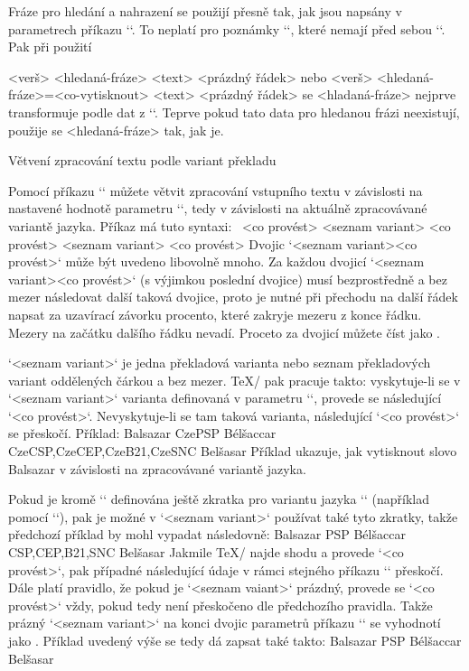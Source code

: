Fráze pro hledání a nahrazení se použijí přesně tak, jak jsou napsány v
parametrech příkazu `\ww`. To neplatí pro poznámky `\Note`, které nemají
před sebou `\ww`. Pak při použití

\begtt
\Note <verš> {<hledaná-fráze>} <text> <prázdný řádek>
\endtt
nebo
\begtt
\Note <verš> {<hledaná-fráze>}={<co-vytisknout>} <text> <prázdný řádek>
\endtt
se <hladaná-fráze> nejprve transformuje podle dat z `\vdef`. Teprve pokud
tato data pro hledanou frázi neexistují, použije se <hledaná-fráze> tak,
jak je.


\secc Větvení zpracování textu podle variant překladu

\mnote{\code{\\switch}}
Pomocí příkazu `\switch` můžete větvit zpracování vstupního textu v
závislosti na nastavené hodnotě parametru `\tmark`, tedy v závislosti na
aktuálně zpracovávané variantě jazyka. Příkaz má tuto syntaxi:
\begtt
{} {<co provést>}%
        {<seznam variant>} {<co provést>}%
        {<seznam variant>} {<co provést>}
\endtt
Dvojic `{<seznam variant>}{<co provést>}` může být uvedeno libovolně mnoho.
Za každou dvojicí `{<seznam variant>}{<co provést>}` (s výjimkou poslední
dvojice) musí bezprostředně a bez mezer následovat další taková dvojice,
proto je nutné při přechodu na
další řádek napsat za uzavírací závorku procento, které zakryje mezeru z
konce řádku. Mezery na začátku dalšího řádku nevadí.
Proceto za dvojicí můžete číst jako .

`<seznam variant>` je
jedna překladová varianta nebo seznam překladových variant oddělených
čárkou a bez mezer. \TeX/ pak pracuje takto: vyskytuje-li
se v `<seznam variant>` varianta definovaná v parametru `\tmark`, provede se
následující `<co provést>`. Nevyskytuje-li se tam taková varianta,
následující `<co provést>` se přeskočí. Příklad:
\begtt
{} {Balsazar}%
        {CzePSP} {Bélšaccar}%
        {CzeCSP,CzeCEP,CzeB21,CzeSNC} {Belšasar}
\endtt
Příklad ukazuje, jak vytisknout slovo Balsazar v závislosti na
zpracovávané variantě jazyka.

\mnote{\code{\\smark}}
Pokud je kromě `\tmark` definována ještě
zkratka pro variantu jazyka `\smark` (například pomocí `\def\smark{CEP}`),
pak je možné v `<seznam variant>` používat také tyto zkratky, takže předchozí
příklad  by mohl vypadat následovně:
\begtt
{}  {Balsazar}%
        {PSP}  {Bélšaccar}%
        {CSP,CEP,B21,SNC} {Belšasar}
\endtt
Jakmile \TeX/ najde shodu a provede `<co provést>`, pak případné následující
údaje v rámci stejného příkazu `\switch` přeskočí. Dále platí pravidlo, že
pokud je `<seznam vaiant>` prázdný, provede se `<co provést>` vždy, pokud
tedy není přeskočeno dle předchozího pravidla. Takže prázný `<seznam variant>` na
konci dvojic parametrů příkazu `\switch` se vyhodnotí jako . Příklad uvedený výše se tedy dá zapsat také takto:
\begtt
{} {Balsazar}%
        {PSP} {Bélšaccar}%
        {}    {Belšasar}
\endtt

